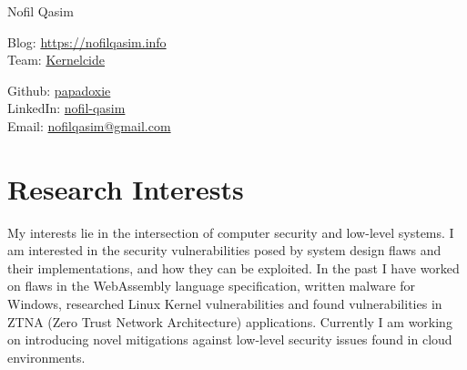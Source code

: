 \documentclass[a4paper,10pt]{article}
\begin{document}
\begin{center}
    {\LARGE Nofil Qasim} \\ \vspace{0pt}
    \begin{multicols}{2}
    \begin{flushleft}
    \large{Blog}: \href{https://papadoxie.github.io/Blog}{https://nofilqasim.info} \\
    \large{Team}: \href{https://kernelcide.github.io/blog}{Kernelcide}
    \end{flushleft}
    
    \begin{flushright}
    \large{Github}: \href{https://github.com/papadoxie}{papadoxie} \\
    \large{LinkedIn}: \href{https://www.linkedin.com/in/nofil-qasim}{nofil-qasim} \\
    \large{Email}: \href{mailto:nofilqasim@gmail.com}{nofilqasim@gmail.com}
    \end{flushright}
    \end{multicols}
\end{center}

\section{Research Interests}
My interests lie in the intersection of computer security and low-level systems.
I am interested in the security vulnerabilities posed by system design flaws and their implementations, and how they can be exploited.
In the past I have worked on flaws in the WebAssembly language specification, written malware for Windows, researched Linux Kernel vulnerabilities and found vulnerabilities in ZTNA (Zero Trust Network Architecture) applications. Currently I am working on introducing novel mitigations against low-level security issues found in cloud environments.

\end{document}

